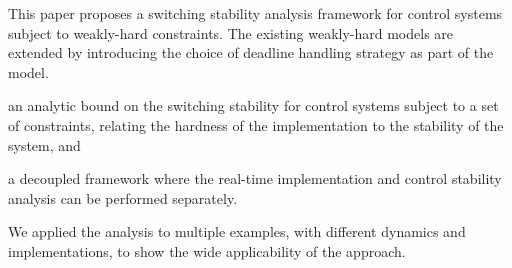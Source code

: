 This paper proposes a switching stability analysis framework for control systems subject to weakly-hard constraints.
The existing weakly-hard models are extended by introducing the choice of deadline handling strategy as part of the model.
\begin{enumerate*}[label=(\roman*)]
    \item an analytic bound on the switching stability for control systems subject to a set of constraints, relating the hardness of the implementation to the stability of the system, and
    \item a decoupled framework where the real-time implementation and control stability analysis can be performed separately.
\end{enumerate*}
We applied the analysis to multiple examples, with different dynamics and implementations, to show the wide applicability of the approach.

